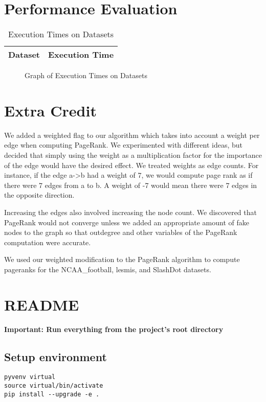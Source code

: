 \documentclass[draft]{report}
\begin{document}
\section{Performance Evaluation}
\begin{table}
  \centering
  \begin{tabular}{}
    \toprule
    Dataset & Execution Time\\
    \midrule
    \bottomrule
  \end{tabular}
  \caption{Execution Times on Datasets}
  \label{execution-times-table}
\end{table}
\begin{figure}
  \centering
  
  \caption{Graph of Execution Times on Datasets}
  \label{execution-times-graph}
\end{figure}

\section{Extra Credit}
We added a weighted flag to our algorithm which takes into account a weight per
edge when computing PageRank. We experimented with different ideas, but decided
that simply using the weight as a multiplication factor for the importance of
the edge would have the desired effect. We treated weights as edge counts.  For
instance, if the edge a->b had a weight of 7, we would compute page rank as if
there were 7 edges from a to b. A weight of -7 would mean there were 7 edges in
the opposite direction.

Increasing the edges also involved increasing the node count. We discovered that
PageRank would not converge unless we added an appropriate amount of fake nodes
to the graph so that outdegree and other variables of the PageRank computation
were accurate.

We used our weighted modification to the PageRank algorithm to compute pageranks
for the NCAA\_football, lesmis, and SlashDot datasets.


\appendix

\section{README}
\lstset{lang=bash}
\textbf{Important: Run everything from the project's root directory}

\subsection{Setup environment}
\begin{lstlisting}
pyvenv virtual
source virtual/bin/activate
pip install --upgrade -e .
\end{lstlisting}
\end{document}
